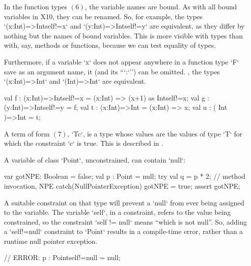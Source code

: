 In the function types {$(6)$}, the variable names are bound.  As with all
bound variables in X10, they can be renamed. So, for example,
the types \xcd`(x:Int)=>Int{self!=x}` and \xcd`(y:Int)=>Int{self!=y}` are
equivalent, as they differ by nothing but the names of bound variables. 
This is more visible with types
than with, say, methods or functions, because we can test equality of types.

Furthermore, if a variable \xcd`x` does not appear anywhere in a function type
\xcd`F` save as an argument name, it (and its ``\xcd`:`'') can be omitted.
\Eg, the types 
\xcd`(x:Int)=>Int`
and 
\xcd`(Int)=>Int`
are equivalent.

\begin{ex}
\begin{xten}
val f : (x:Int)=>Int{self!=x} = (x:Int) => (x+1) as Int{self!=x}; 
val g : (y:Int)=>Int{self!=y} = f;
val t : (x:Int)=>Int          = (x:Int) => x;
val u : ( Int )=>Int          = t;
\end{xten}
\end{ex}


A term of form {$(7)$}, \xcd`T{c}`, is a type whose values are the values of
type \xcd`T` for which the constraint \xcd`c` is true.  This is described in
. 

\begin{ex}
A variable of class \xcd`Point`, unconstrained, can contain \xcd`null`: 
\begin{xten}
var gotNPE: Boolean = false;
val p : Point = null; 
try {
  val q = p * 2; // method invocation, NPE
}
catch(NullPointerException) {
  gotNPE = true;
}
assert gotNPE;
\end{xten}

A suitable constraint on that type will prevent a \xcd`null` from ever being
assigned to the variable.  The variable \xcd`self`, in a constraint, refers to
the value being constrained, so the constraint \xcd`self != null` means
``which is not null''.  So, adding a \xcd`{self!=null}` constraint to 
\xcd`Point` results in a compile-time error, rather than a runtime null
pointer exception.  
\begin{xten}
// ERROR: p : Point{self!=null} = null;
\end{xten}
\end{ex}


